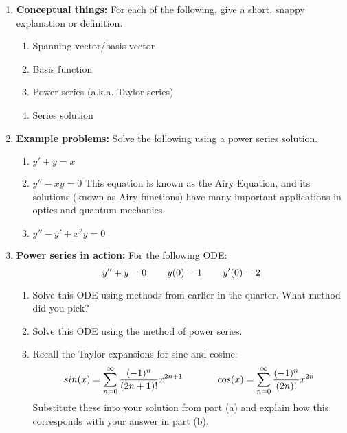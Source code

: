 \documentclass[letterpaper, fontsize=11pt]{scrartcl} %
\numberwithin{equation}{section} %
\numberwithin{figure}{section} %
\numberwithin{table}{section} %
\begin{document}
\begin{enumerate}

\item \textbf{Conceptual things:}  For each of the following, give a short, snappy explanation or definition.
\begin{enumerate}
\item Spanning vector/basis vector 
\item Basis function

\item Power series (a.k.a. Taylor series)

\item Series solution

\end{enumerate}

\item \textbf{Example problems:}  Solve the following using a power series solution. 

\begin{enumerate}
\item $y' + y = x$

\item $y'' - xy = 0$ \newline
This equation is known as the Airy Equation, and its solutions (known as Airy functions) have many important applications in optics and quantum mechanics. 

\item $y'' - y' + x^2y = 0$


\end{enumerate}

\item \textbf{Power series in action:}  For the following ODE:
$$y'' + y = 0 \hspace{0.3in} y(0) = 1  \hspace{0.3in} y'(0) = 2$$
\begin{enumerate}

\item Solve this ODE using methods from earlier in the quarter. What method did you pick?
\item Solve this ODE using the method of power series. 
\item Recall the Taylor expansions for sine and cosine:
$$sin(x) = \sum\limits_{n=0}^\infty \frac{(-1)^n}{(2n+1)!}x^{2n+1} \hspace{0.5in} cos(x) = \sum\limits_{n=0}^\infty \frac{(-1)^n}{(2n)!}x^{2n}$$
Substitute these into your solution from part (a) and explain how this corresponds with your answer in part (b).\end{enumerate}


\end{enumerate}

\end{document}

